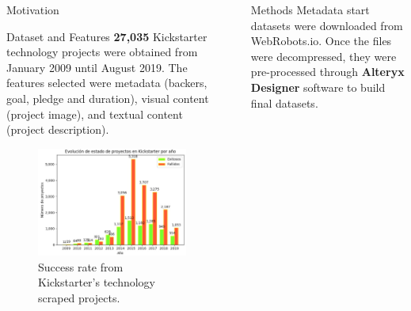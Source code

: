 \documentclass[final]{beamer}
\newlength{\sepwid}
\newlength{\onecolwid}
\begin{document}
\begin{frame}[t]
\begin{columns}[t]
\begin{column}{\onecolwid}
\begin{block}{Motivation}
\end{block}

\begin{block}{Dataset and Features}
		\textbf{27,035} Kickstarter technology projects were obtained from January 2009 until August 2019. The features selected were metadata (backers, goal, pledge and duration), visual content (project image), and textual content (project description).
	\begin{figure}
		\includegraphics[width=0.75\linewidth]{scraped_projects.jpg}
		\caption{Success rate from Kickstarter's technology scraped projects.}
	\end{figure}
	
\end{block}


\end{column} %

\begin{column}{\sepwid}\end{column} %



\begin{column}{\onecolwid} %
	\begin{block}{Methods}
	Metadata start datasets were downloaded from WebRobots.io. Once the files were decompressed, they were pre-processed through \textbf{Alteryx Designer} software to build final datasets.
		

\end{block}
\end{column}
\end{columns}
\end{frame}
\end{document}
